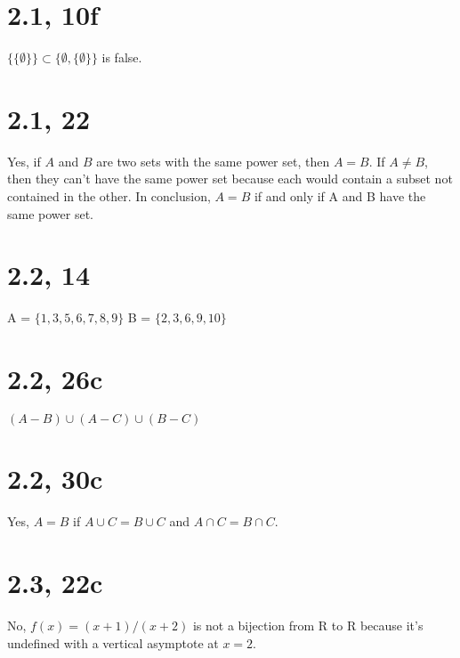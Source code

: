 \documentclass{article}
\title{Discrete Math: Problem Set #2}
\author{Jackie Luo}
\date{February 25, 2015}
\begin{document}
\maketitle

\section{2.1, 10f}
$\{\{\emptyset\}\} \subset \{\emptyset, \{\emptyset\}\}$ is false.

\section{2.1, 22}
Yes, if $A$ and $B$ are two sets with the same power set, then $A = B$. If $A \neq B$, then they can't have the same power set because each would contain a subset not contained in the other. In conclusion, $A = B$ if and only if A and B have the same power set.

\section{2.2, 14}
A = $\{1, 3, 5, 6, 7, 8, 9\}$
\newline
B = $\{2, 3, 6, 9, 10\}$

\section{2.2, 26c}
$(A - B) \cup (A - C) \cup (B - C)$
\newline
\begin{center}
\def\firstcircle{(90:1.75cm) circle (2.5cm)}
\def\secondcircle{(210:1.75cm) circle (2.5cm)}
\def\thirdcircle{(330:1.75cm) circle (2.5cm)}
\end{center}

\section{2.2, 30c}
Yes, $A = B$ if $A \cup C = B \cup C$ and $A \cap C = B \cap C$.

\section{2.3, 22c}
No, $f(x) = (x + 1)/(x + 2)$ is not a bijection from R to R because it's undefined with a vertical asymptote at $x = 2$.
\end{document}
